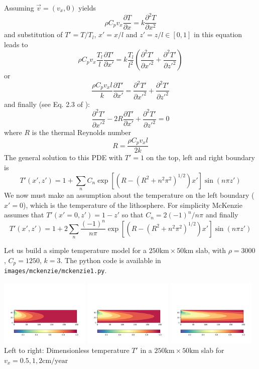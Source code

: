 Assuming $\vec v=(v_x,0)$ yields
\[
\rho C_p v_x \frac{\partial T}{\partial x} = k \frac{\partial^2 T}{\partial x^2}
\]
and substitution of $T'=T/T_l$, $x'=x/l$ and $z'=z/l\in[0,1]$ in this equation leads to
\[
\rho C_p v_x \frac{T_l}{l}\frac{\partial T'}{\partial x'} = k \frac{T_l}{l^2}
\left( \frac{\partial^2 T'}{\partial x'^2}
+ \frac{\partial^2 T'}{\partial z'^2} \right)
\]
or 
\[
\frac{\rho C_p v_x l }{k}\frac{\partial T'}{\partial x'} = 
\frac{\partial^2 T'}{\partial x'^2}
+ \frac{\partial^2 T'}{\partial z'^2} 
\]
and finally (see Eq. 2.3 of \cite{mcke69}): 
\[
\frac{\partial^2 T'}{\partial x'^2}
- 2 R \frac{\partial T'}{\partial x'} 
+ \frac{\partial^2 T'}{\partial z'^2} =0
\]
where $R$ is the thermal Reynolds number
\[
R=\frac{\rho C_p v_x l}{2 k}
\] 
The general solution to this PDE with $T'=1$ on the top, left and right boundary is 
\[
T'(x',z')= 1 + \sum_n C_n \exp \left[ \left( R-(R^2+n^2\pi^2)^{1/2} \right) x' \right] \sin (n \pi z')
\]
We now must make an assumption about the temperature on the left boundary ($x'=0$), 
which is the temperature of the lithosphere. 
For simplicity McKenzie assumes that $T'(x'=0,z')=1-z'$ so that $C_n=2(-1)^n/n\pi$ and finally
\begin{equation}
\boxed{
T'(x',z')= 1 + 2\sum_n \frac{(-1)^n}{n \pi} \exp \left[ \left( R-(R^2+n^2\pi^2)^{1/2} \right) x' \right] \sin (n \pi z')
}
\end{equation}

Let us build a simple temperature model for a $250\text{km}\times 50\text{km}$ slab, 
with $\rho=3000$, $C_p=1250$, $k=3$. The python code is available in {\tt images/mckenzie/mckenzie1.py}.

\begin{center}
\includegraphics[width=0.32\textwidth]{images/mckenzie/temperature_vel0p5.pdf}
\includegraphics[width=0.32\textwidth]{images/mckenzie/temperature_vel1.pdf}
\includegraphics[width=0.32\textwidth]{images/mckenzie/temperature_vel2.pdf}\\
{\small Left to right: Dimensionless temperature $T'$ in a $250\text{km}\times 50\text{km}$ slab 
for $v_x={0.5,1,2}\text{cm/year}$}
\end{center}

